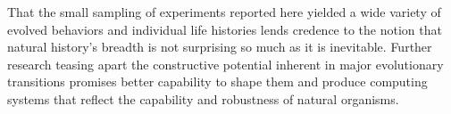 That the small sampling of experiments reported here yielded a wide variety of evolved behaviors and individual life histories lends credence to the notion that natural history's breadth is not surprising so much as it is inevitable.
Further research teasing apart the constructive potential inherent in major evolutionary transitions promises better capability to shape them and produce computing systems that reflect the capability and robustness of natural organisms.
